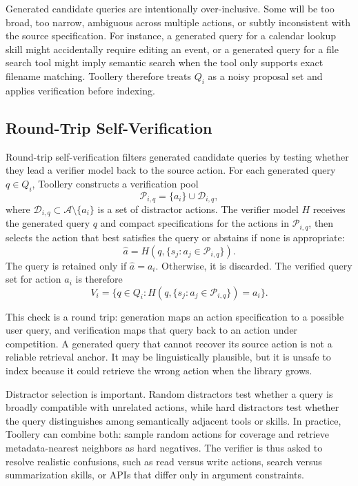 \documentclass[11pt]{article}
\begin{document}
Generated candidate queries are intentionally over-inclusive. Some will be too broad, too narrow, ambiguous across multiple actions, or subtly inconsistent with the source specification. For instance, a generated query for a calendar lookup skill might accidentally require editing an event, or a generated query for a file search tool might imply semantic search when the tool only supports exact filename matching. Toollery therefore treats $Q_i$ as a noisy proposal set and applies verification before indexing.

\subsection{Round-Trip Self-Verification}
\label{sec:self_verification}

Round-trip self-verification filters generated candidate queries by testing whether they lead a verifier model back to the source action. For each generated query $q \in Q_i$, Toollery constructs a verification pool
\begin{equation}
    \mathcal{P}_{i,q} = \{a_i\} \cup \mathcal{D}_{i,q},
\end{equation}
where $\mathcal{D}_{i,q} \subset \mathcal{A} \setminus \{a_i\}$ is a set of distractor actions. The verifier model $H$ receives the generated query $q$ and compact specifications for the actions in $\mathcal{P}_{i,q}$, then selects the action that best satisfies the query or abstains if none is appropriate:
\begin{equation}
    \hat{a} = H(q, \{s_j : a_j \in \mathcal{P}_{i,q}\}).
\end{equation}
The query is retained only if $\hat{a} = a_i$. Otherwise, it is discarded. The verified query set for action $a_i$ is therefore
\begin{equation}
    V_i = \{q \in Q_i : H(q, \{s_j : a_j \in \mathcal{P}_{i,q}\}) = a_i\}.
\end{equation}

This check is a round trip: generation maps an action specification to a possible user query, and verification maps that query back to an action under competition. A generated query that cannot recover its source action is not a reliable retrieval anchor. It may be linguistically plausible, but it is unsafe to index because it could retrieve the wrong action when the library grows.

Distractor selection is important. Random distractors test whether a query is broadly compatible with unrelated actions, while hard distractors test whether the query distinguishes among semantically adjacent tools or skills. In practice, Toollery can combine both: sample random actions for coverage and retrieve metadata-nearest neighbors as hard negatives. The verifier is thus asked to resolve realistic confusions, such as read versus write actions, search versus summarization skills, or APIs that differ only in argument constraints.
\end{document}
